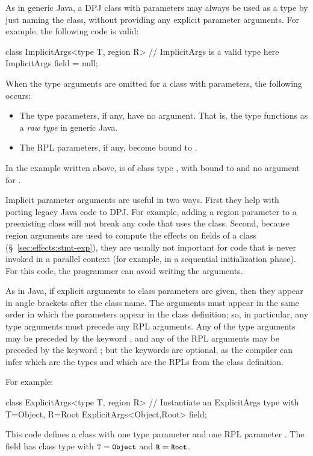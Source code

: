   As in generic Java, a DPJ class
with parameters may always be used as a type by just naming the class,
without providing any explicit parameter arguments.  For example, the
following code is valid:
%
\begin{dpjlisting}
class ImplicitArgs<type T, region R> {
  // ImplicitArgs is a valid type here
  ImplicitArgs field = null;
}
\end{dpjlisting}
%

When the type arguments are omitted for a class with parameters, the
following occurs:
%
\begin{itemize}
%
\item The type parameters, if any, have no argument.  That is, the
  type functions as a \emph{raw type} in generic Java.
%
\item The RPL parameters, if any, become bound to .
%
\end{itemize}
%
In the example written above,  is of class type
, with  bound to  and no
argument for .

Implicit parameter arguments are useful in two ways.  First they help
with porting legacy Java code to DPJ.  For example, adding a region
parameter to a preexisting class will not break any code that uses the
class.  Second, because region arguments are used to compute the
effects on fields of a class (\S~\ref{sec:effects:stmt-exp}), they are
usually not important for code that is never invoked in a parallel
context (for example, in a sequential initialization phase).  For this
code, the programmer can avoid writing the arguments.

 As in Java, if explicit
arguments to class parameters are given, then they appear in angle
brackets after the class name.  The arguments must appear in the same
order in which the parameters appear in the class definition; so, in
particular, any type arguments must precede any RPL arguments.  Any of
the type arguments may be preceded by the keyword , and any
of the RPL arguments may be preceded by the keyword ; but
the keywords are optional, as the compiler can infer which are the
types and which are the RPLs from the class definition.

For example:
%
\begin{dpjlisting}
class ExplicitArgs<type T, region R> {
  // Instantiate an ExplicitArgs type with T=Object, R=Root
  ExplicitArgs<Object,Root> field;
}
\end{dpjlisting}
%
This code defines a class  with one type parameter
 and one RPL parameter .  The field  has
class type  with $\mbox{\small{\texttt{T}}}=\mbox{\small{\texttt{Object}}}$ and
$\mbox{\small{\texttt{R}}}=\mbox{\small{\texttt{Root}}}$.

